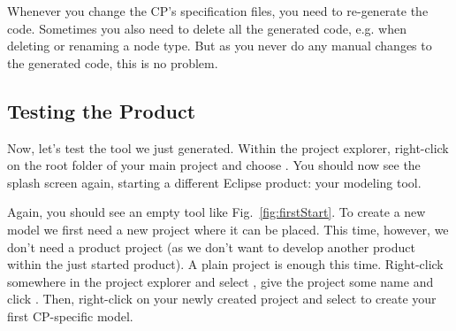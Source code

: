 \documentclass[a4paper,american,12pt]{scrreprt}
\begin{document}
Whenever you change the CP's specification files, you need to re-generate the
code. Sometimes you also need to delete all the generated code, e.g. when
deleting or renaming a node type. But as you never do any manual changes to the
generated code, this is no problem. 

\subsection{Testing the \cinco Product}

Now, let's test the tool we just generated. Within the project explorer,
right-click on the root folder of your main project and choose . You should now see the \cinco splash screen again,
starting a different Eclipse product: your modeling tool. \footnotemark


Again, you should see an empty tool like Fig.~\ref{fig:firstStart}. To create a
new model we first need a new project where it can be placed. This time,
however, we don't need a \cinco product project (as we don't want to develop
another \cinco product within the just started \cinco product). A plain project
is enough this time. Right-click somewhere in the project explorer and select
, give the project some name
and click . Then, right-click on your newly created project and
select  to create your
first CP-specific model.
\end{document}
